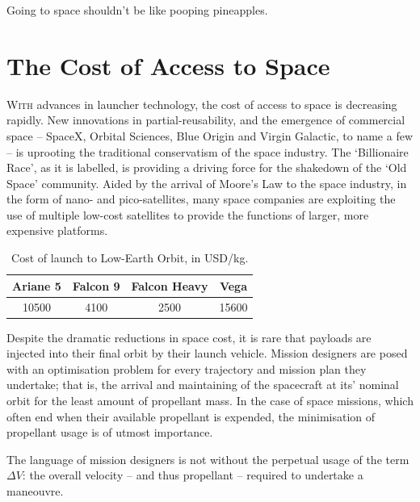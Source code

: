 \begin{savequote}[75mm]
Going to space shouldn't be like pooping pineapples.
\end{savequote}

\chapter{The Cost of Access to Space}
\label{costofaccess}
\begin{multicols*}{2}
\lettrine{W}{ith} advances in launcher technology, the cost of access to space is decreasing rapidly. New innovations in partial-reusability, and the emergence of commercial space -- SpaceX, Orbital Sciences, Blue Origin and Virgin Galactic, to name a few -- is uprooting the traditional conservatism of the space industry. The `Billionaire Race', as it is labelled, is providing a driving force for the shakedown of the `Old Space' community. Aided by the arrival of Moore's Law to the space industry, in the form of nano- and pico-satellites, many space companies are exploiting the use of multiple low-cost satellites to provide the functions of larger, more expensive platforms. %

\begin{table}[h]
\centering
\begin{tabular}{cccc}
\toprule
\toprule
Ariane 5 & Falcon 9 & Falcon Heavy \footnotemark & Vega \\
\midrule
10500 & 4100 & 2500 & 15600 \\ 
\bottomrule
\bottomrule
\end{tabular}
\caption{Cost of launch to Low-Earth Orbit, in USD/kg. \citep{Vicens2016}}
\label{t:costofaccess}
\end{table}
Despite the dramatic reductions in space cost, it is rare that payloads are injected into their final orbit by their launch vehicle. Mission designers are posed with an optimisation problem for every trajectory and mission plan they undertake; that is, the arrival and maintaining of the spacecraft at its' nominal orbit for the least amount of propellant mass. In the case of space missions, which often end when their available propellant is expended, the minimisation of propellant usage is of utmost importance. 

The language of mission designers is not without the perpetual usage of the term $\Delta V$: the overall velocity -- and thus propellant -- required to undertake a maneouvre. 


\end{multicols*}
